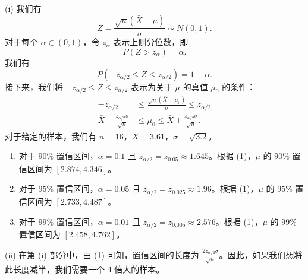 \begin{questions}
\begin{solution}
(i) 我们有
\[
Z = \frac{\sqrt{n}(\bar{X} - \mu)}{\sigma} \sim N(0, 1).
\]
对于每个 $\alpha \in (0, 1)$，令 $z_{\alpha}$ 表示上侧分位数，即
\[
P(Z > z_{\alpha}) = \alpha.
\]
我们有
\[
P(-z_{\alpha/2} \le Z \le z_{\alpha/2}) = 1 - \alpha.
\]
接下来，我们将 $-z_{\alpha/2} \le Z \le z_{\alpha/2}$ 表示为关于 $\mu$ 的真值 $\mu_0$ 的条件：
\begin{align*}
-z_{\alpha/2} &\le \frac{\sqrt{n}(\bar{X} - \mu_0)}{\sigma} \le z_{\alpha/2} \\
\bar{X} - \frac{z_{\alpha/2} \sigma}{\sqrt{n}} &\le \mu_0 \le \bar{X} + \frac{z_{\alpha/2} \sigma}{\sqrt{n}}. \tag{1}
\end{align*}
对于给定的样本，我们有 $n = 16$，$\bar{X} = 3.61$，$\sigma = \sqrt{3.2}$。
\begin{enumerate}
    \item 对于 $90\%$ 置信区间，$\alpha = 0.1$ 且 $z_{\alpha/2} = z_{0.05} \approx 1.645$。根据 (1)，$\mu$ 的 $90\%$ 置信区间为 $[2.874, 4.346]$。
    \item 对于 $95\%$ 置信区间，$\alpha = 0.05$ 且 $z_{\alpha/2} = z_{0.025} \approx 1.96$。根据 (1)，$\mu$ 的 $95\%$ 置信区间为 $[2.733, 4.487]$。
    \item 对于 $99\%$ 置信区间，$\alpha = 0.01$ 且 $z_{\alpha/2} = z_{0.005} \approx 2.576$。根据 (1)，$\mu$ 的 $99\%$ 置信区间为 $[2.458, 4.762]$。
\end{enumerate}
\end{solution}

\begin{solution}
(ii) 在第 (i) 部分中，由 (1) 可知，置信区间的长度为 $\frac{2 z_{\alpha/2} \sigma}{\sqrt{n}}$。因此，如果我们想将此长度减半，我们需要一个 $4$ 倍大的样本。
\end{solution}


\end{questions}
